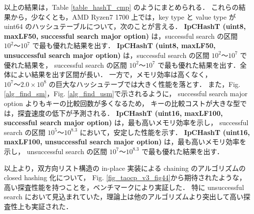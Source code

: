 以上の結果は，Table \ref{table_hashT_cmp} のようにまとめられる．
これらの結果から，少なくとも，AMD Ryzen7 1700 上では，key type と value type が uint64 のハッシュテーブルについて，次のことが言える．
{\bf IpCHashT (uint8, maxLF50, successful search major option)} は，successful search の区間 $10^2〜10^7$ で最も優れた結果を出す．
{\bf IpCHashT (uint8, maxLF50, unsuccessful search major option)} は，successful search の区間 $10^2〜10^7$ で優れた結果を，
successful search の区間 $10^2〜10^7$ で最も優れた結果を出す．全体によい結果を出す区間が長い．
一方で，メモリ効率は高くなく，$10^7〜2.0\times10^8$ の巨大なハッシュテーブでは大きく性能を落とす．
また，Fig. \ref{alg_find_sm}，Fig. \ref{alg_find_usm}で示されるように，
successful search major option よりもキーの比較回数が多くなるため，
キーの比較コストが大きな型では，探査速度の低下が予測される．
{\bf IpCHashT (uint16, maxLF100, successful search major option)} は，最も高いメモリ効率を示し，
successful search の区間 $10^5〜10^{8.3}$ において，安定した性能を示す．
{\bf IpCHashT (uint16, maxLF100, unsuccessful search major option)} は，最も高いメモリ効率を示し，
unsuccessful search の区間 $10^7〜10^{8.3}$ で最も優れた結果を出す．

以上より，双方向リスト構造の in-place 実装による chaining のアルゴリズムの closed hashing 化について，
Fig. \ref{fig_taocp_v3_fig44}から期待されたような，高い探査性能を持つことを，ベンチマークにより実証した．
特に unsuccessful search において見込まれていた，理論上は他のアルゴリズムより突出して高い探査性上も実証された．

